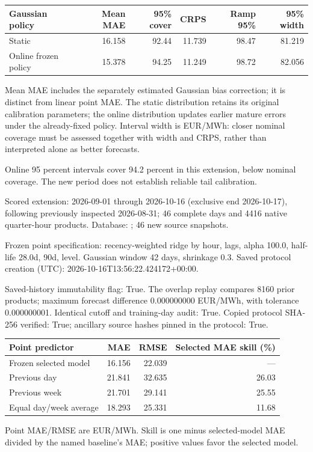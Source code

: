 \documentclass[11pt,a4paper]{article}
\begin{document}
{\small\begin{longtable}{lrrrrr}
\toprule Gaussian policy & Mean MAE & 95\% cover & CRPS & Ramp 95\% & 95\% width \\ \midrule
\endhead
Static & 16.158 & 92.44 & 11.739 & 98.47 & 81.219 \\
Online frozen policy & 15.378 & 94.25 & 11.249 & 98.72 & 82.056 \\
\bottomrule\end{longtable}}
Mean MAE includes the separately estimated Gaussian bias correction; it is distinct from linear point MAE. The static distribution retains its original calibration parameters; the online distribution updates earlier mature errors under the already-fixed policy. Interval width is EUR/MWh: closer nominal coverage must be assessed together with width and CRPS, rather than interpreted alone as better forecasts.

Online 95 percent intervals cover 94.2 percent in this extension, below nominal coverage. The new period does not establish reliable tail calibration.

Scored extension: 2026-09-01 through 2026-10-16 (exclusive end 2026-10-17), following previously inspected 2026-08-31; 46 complete days and 4416 native quarter-hour products. Database: ; 46 new source snapshots.

Frozen point specification: recency-weighted ridge by hour, lags, alpha 100.0, half-life 28.0d, 90d, level. Gaussian window 42 days, shrinkage 0.3. Saved protocol creation (UTC): 2026-10-16T13:56:22.424172+00:00.

Saved-history immutability flag: True. The overlap replay compares 8160 prior products; maximum forecast difference 0.000000000 EUR/MWh, with tolerance 0.000000001. Identical cutoff and training-day audit: True. Copied protocol SHA-256 verified: True; ancillary source hashes pinned in the protocol: True.

{\small\begin{longtable}{lrrr}
\toprule Point predictor & MAE & RMSE & Selected MAE skill (\%) \\ \midrule
\endhead
Frozen selected model & 16.156 & 22.039 & --- \\
Previous day & 21.841 & 32.635 & 26.03 \\
Previous week & 21.701 & 29.141 & 25.55 \\
Equal day/week average & 18.293 & 25.331 & 11.68 \\
\bottomrule\end{longtable}}
Point MAE/RMSE are EUR/MWh. Skill is one minus selected-model MAE divided by the named baseline's MAE; positive values favor the selected model.
\end{document}
